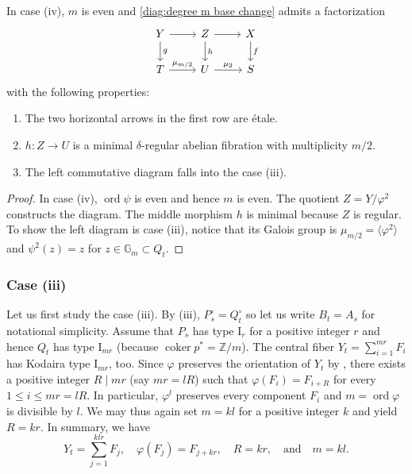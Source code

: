 \documentclass[reqno, letterpaper]{amsart}
\numberwithin{equation}{subsection}
\let\to\longrightarrow
\newcommand{\GG}{\mathbb{G}}
\newcommand{\ZZ}{\mathbb{Z}}
\DeclareMathOperator{\coker}{coker}
\DeclareMathOperator{\ord}{ord}
\begin{document}
		\begin{lemma} \label{lem:classification of multiple fiber iv:reduction to iii}
			In case (iv), $m$ is even and \eqref{diag:degree m base change} admits a factorization
			\[\begin{tikzcd}[column sep=normal]
				Y \arrow[r] \arrow[d, "g"] & Z \arrow[r] \arrow[d, "h"] & X \arrow[d, "f"] \\
				T \arrow[r, "\mu_{m/2}"] & U \arrow[r, "\mu_2"] & S
			\end{tikzcd}\]
			with the following properties:
			\begin{enumerate}
				\item The two horizontal arrows in the first row are \'etale.
				\item $h : Z \to U$ is a minimal $\delta$-regular abelian fibration with multiplicity $m/2$.
				\item The left commutative diagram falls into the case (iii).
			\end{enumerate}
		\end{lemma}
		\begin{proof}
			In case (iv), $\ord \psi$ is even and hence $m$ is even. The quotient $Z = Y/\varphi^2$ constructs the diagram. The middle morphism $h$ is minimal because $Z$ is regular. To show the left diagram is case (iii), notice that its Galois group is $\mu_{m/2} = \langle \varphi^2 \rangle$ and $\psi^2(z) = z$ for $z \in \GG_m \subset Q_t$.
		\end{proof}
		
		
		
		\subsubsection{Case (iii)}
			Let us first study the case (iii). By (iii), $P_s^\circ = Q_t^\circ$ so let us write $B_t = A_s$ for notational simplicity. Assume that $P_s$ has type $\mathrm I_r$ for a positive integer $r$ and hence $Q_t$ has type $\mathrm I_{mr}$ (because $\coker p^* = \ZZ/m$). The central fiber $Y_t = \sum_{i=1}^{mr} F_i$ has Kodaira type $\mathrm I_{mr}$, too. Since $\varphi$ preserves the orientation of $Y_t$ by , there exists a positive integer $R \mid mr$ (say $mr = lR$) such that $\varphi(F_i) = F_{i + R}$ for every $1 \le i \le mr = lR$. In particular, $\varphi^l$ preserves every component $F_i$ and $m = \ord \varphi$ is divisible by $l$. We may thus again set $m = kl$ for a positive integer $k$ and yield $R = kr$. In summary, we have
			\begin{equation} \label{eq:definition of klr}
				Y_t = \sum_{j=1}^{klr} F_j ,\quad \varphi(F_j) = F_{j + kr}, \quad R = kr, \quad\mbox{and}\quad m = kl .
			\end{equation}
			
\end{document}
